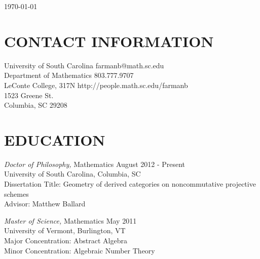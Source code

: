 \documentclass[line,overlapped]{res}
\begin{document}
\hfill \today

\begin{resume}
  
  
  \section{CONTACT INFORMATION}
  University of South Carolina \hfill farmanb@math.sc.edu\\
  Department of Mathematics \hfill 803.777.9707\\
  LeConte College, 317N \hfill http://people.math.sc.edu/farmanb\\
  1523 Greene St.\\
  Columbia, SC 29208
  
  \section{EDUCATION} 
          {\sl Doctor of Philosophy,} Mathematics \hfill August 2012 - Present\\
          University of South Carolina, Columbia, SC\\
          Dissertation Title: Geometry of derived categories on noncommutative projective schemes\\
          Advisor: Matthew Ballard

          {\sl Master of Science,} Mathematics \hfill May 2011\\
          University of Vermont, Burlington, VT\\
          Major Concentration: Abstract Algebra\\
          Minor Concentration: Algebraic Number Theory


\end{resume}
\end{document}
